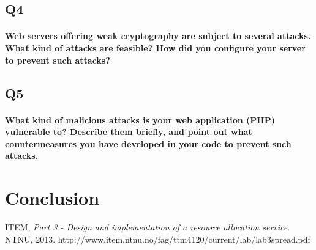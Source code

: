 \documentclass[a4paper,11pt]{article}
\begin{document}
\subsection{Q4}
\paragraph{Web servers oﬀering weak cryptography are subject to several attacks. What kind of
attacks are feasible? How did you conﬁgure your server to prevent such attacks?}
\subsection{Q5}
\paragraph{What kind of malicious attacks is your web application (PHP) vulnerable to? Describe
them brieﬂy, and point out what countermeasures you have developed in your code to prevent
such attacks.}
\section*{Conclusion}
\begin{thebibliography}{9}
ITEM, 
	\emph{Part 3 - Design and implementation of a resource allocation service}.
	NTNU, 2013. http://www.item.ntnu.no/fag/ttm4120/current/lab/lab3spread.pdf
\end{thebibliography}
\listoffigures
\end{document}
